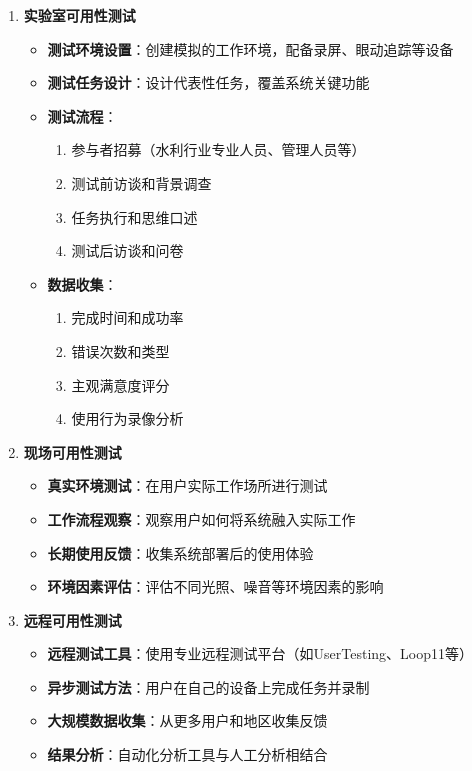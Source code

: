 \begin{enumerate}
\def\labelenumi{\arabic{enumi}.}
\tightlist
\item
  \textbf{实验室可用性测试}

  \begin{itemize}
  \tightlist
  \item
    \textbf{测试环境设置}：创建模拟的工作环境，配备录屏、眼动追踪等设备
  \item
    \textbf{测试任务设计}：设计代表性任务，覆盖系统关键功能
  \item
    \textbf{测试流程}：

    \begin{enumerate}
    \def\labelenumii{\arabic{enumii}.}
    \tightlist
    \item
      参与者招募（水利行业专业人员、管理人员等）
    \item
      测试前访谈和背景调查
    \item
      任务执行和思维口述
    \item
      测试后访谈和问卷
    \end{enumerate}
  \item
    \textbf{数据收集}：

    \begin{enumerate}
    \def\labelenumii{\arabic{enumii}.}
    \tightlist
    \item
      完成时间和成功率
    \item
      错误次数和类型
    \item
      主观满意度评分
    \item
      使用行为录像分析
    \end{enumerate}
  \end{itemize}
\item
  \textbf{现场可用性测试}

  \begin{itemize}
  \tightlist
  \item
    \textbf{真实环境测试}：在用户实际工作场所进行测试
  \item
    \textbf{工作流程观察}：观察用户如何将系统融入实际工作
  \item
    \textbf{长期使用反馈}：收集系统部署后的使用体验
  \item
    \textbf{环境因素评估}：评估不同光照、噪音等环境因素的影响
  \end{itemize}
\item
  \textbf{远程可用性测试}

  \begin{itemize}
  \tightlist
  \item
    \textbf{远程测试工具}：使用专业远程测试平台（如UserTesting、Loop11等）
  \item
    \textbf{异步测试方法}：用户在自己的设备上完成任务并录制
  \item
    \textbf{大规模数据收集}：从更多用户和地区收集反馈
  \item
    \textbf{结果分析}：自动化分析工具与人工分析相结合
  \end{itemize}
\end{enumerate}


